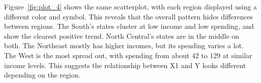 \documentclass[12pt,letterpaper]{article}
\begin{document}
\begin{itemize}
\noindent Figure~\ref{fig:plot_4} shows the same scatterplot, with each region displayed using a different color and symbol. This reveals that the overall pattern hides differences between regions. The South's states cluster at low income and low spending, and show the clearest positive trend. North Central's states are in the middle on both. The Northeast mostly has higher incomes, but its spending varies a lot. The West is the most spread out, with spending from about 42 to 129 at similar income levels. This suggests the relationship between X1 and Y looks different depending on the region.

\end{itemize}
\end{document}
